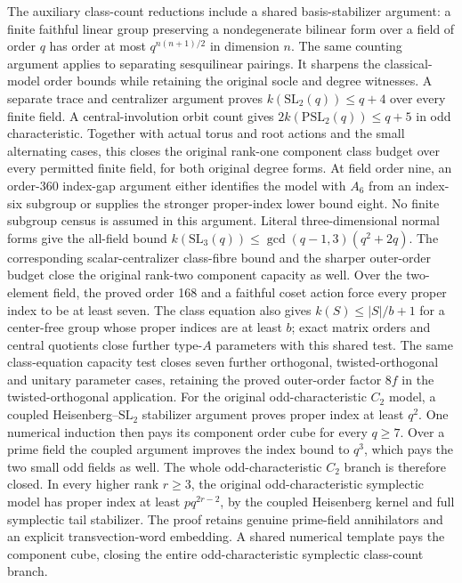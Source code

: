 The auxiliary class-count reductions include a shared basis-stabilizer
argument: a finite faithful linear group preserving a nondegenerate
bilinear form over a field of order $q$ has order at most
$q^{n(n+1)/2}$ in dimension $n$. The same counting argument applies
to separating sesquilinear pairings. It sharpens the classical-model
order bounds while retaining the original socle and degree witnesses.
A separate trace and centralizer argument proves $k(\mathrm{SL}_2(q))\leq q+4$
over every finite field. A central-involution orbit count gives
$2k(\mathrm{PSL}_2(q))\leq q+5$ in odd characteristic. Together with
actual torus and root actions and the small alternating cases, this
closes the original rank-one component class budget over every permitted
finite field, for both original degree forms. At field order nine, an
order-360 index-gap argument either identifies the model with $A_6$ from
an index-six subgroup or supplies the stronger proper-index lower bound
eight. No finite subgroup census is assumed in this argument.
Literal three-dimensional normal forms give the all-field bound
$k(\mathrm{SL}_3(q))\leq\gcd(q-1,3)(q^2+2q)$. The corresponding
scalar-centralizer class-fibre bound and the sharper outer-order budget
close the original rank-two component capacity as well. Over the
two-element field, the proved order 168 and a faithful coset action force
every proper index to be at least seven.
The class equation also gives $k(S)\leq |S|/b+1$ for a center-free
group whose proper indices are at least $b$; exact matrix orders and
central quotients close further type-$A$ parameters with this shared
test. The same class-equation capacity test closes seven further
orthogonal, twisted-orthogonal and unitary parameter cases, retaining
the proved outer-order factor $8f$ in the twisted-orthogonal application. For the original
odd-characteristic $C_2$ model, a coupled
Heisenberg--$\mathrm{SL}_2$ stabilizer argument proves proper index at
least $q^2$. One numerical induction then pays its component order cube
for every $q\geq7$.
Over a prime field the coupled argument improves the index bound to
$q^3$, which pays the two small odd fields as well. The whole
odd-characteristic $C_2$ branch is therefore closed.
In every higher rank $r\geq3$, the original odd-characteristic
symplectic model has proper index at least $p q^{2r-2}$, by the coupled
Heisenberg kernel and full symplectic tail stabilizer. The proof retains
genuine prime-field annihilators and an explicit transvection-word
embedding. A shared numerical template pays the component cube, closing
the entire odd-characteristic symplectic class-count branch.
